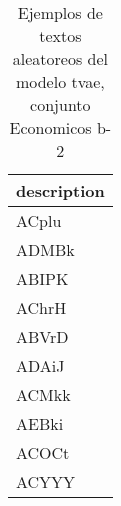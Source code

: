 \begin{table}[H]
\centering
\fontsize{8}{14}\selectfont
\caption{Ejemplos de textos aleatoreos del modelo tvae, conjunto Economicos b-2}
\label{table-sample10-economicos-b-2-tvae-text}
\begin{tabular}{|m{50em}|}
\hline
\rowcolor[gray]{0.8}
description \\
\hline ACplu \\
\hline ADMBk \\
\hline ABIPK \\
\hline AChrH \\
\hline ABVrD \\
\hline ADAiJ \\
\hline ACMkk \\
\hline AEBki \\
\hline ACOCt \\
\hline ACYYY \\
\hline
\end{tabular}
\end{table}
